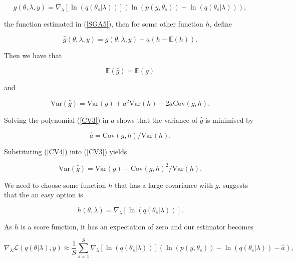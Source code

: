 \documentclass{article}\usepackage[]{graphicx}\usepackage[]{color}
\numberwithin{equation}{section}
\begin{document}
\begin{equation}
\label{CV1}
g(\theta, \lambda, y) =  \nabla_{\lambda} [\ln(q(\theta_s | \lambda))] (\ln (p(y, \theta_s)) - \ln(q(\theta_s | \lambda))),
\end{equation}

the function estimated in (\ref{SGA5}), then for some other function $h$, define

\begin{equation}
\label{CV2}
\hat{g}(\theta, \lambda, y) = g(\theta, \lambda, y) - a(h - \mathbb{E}(h)).
\end{equation}

Then we have that

\begin{equation}
\mathbb{E}(\hat{g}) = \mathbb{E}(g)
\end{equation}

and

\begin{equation}
\label{CV3}
\mbox{Var}(\hat{g}) = \mbox{Var}(g) + a^2 \mbox{Var}(h) - 2a\mbox{Cov}(g, h). 
\end{equation}

Solving the polynomial (\ref{CV3}) in $a$ shows that the variance of $\hat{g}$ is minimised by 

\begin{equation}
\label{CV4}
\hat{a} = \mbox{Cov}(g, h)/\mbox{Var}(h).
\end{equation}

Substituting (\ref{CV4}) into (\ref{CV3}) yields

\begin{equation}
\label{CV5}
\mbox{Var}(\hat{g}) = \mbox{Var}(g) - \mbox{Cov}(g, h)^2/\mbox{Var}(h).
\end{equation}

We need to choose some function $h$ that has a large covariance with $g$. \citet{Ranganath2014} suggests that the an easy option is

\begin{equation}
\label{CV6}
h(\theta, \lambda) = \nabla_{\lambda} [\ln(q(\theta_s | \lambda))].
\end{equation}

As $h$ is a score function, it has an expectation of zero and our estimator becomes

\begin{equation}
\label{CV7}
\nabla_{\lambda} \mathcal{L}(q(\theta | \lambda), y) \approx \frac{1}{S}\sum_{s=1}^{S} \nabla_{\lambda} [\ln(q(\theta_s | \lambda))] (\ln (p(y, \theta_s)) - \ln(q(\theta_s | \lambda)) - \hat{a}),
\end{equation}
\end{document}
